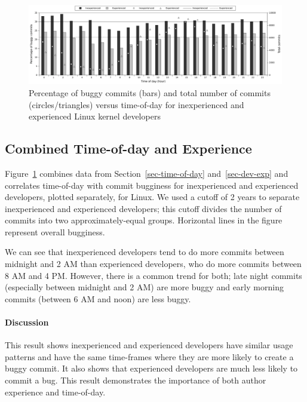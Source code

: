 \begin{figure}[tbh]
\includegraphics[width=\textwidth]{linux-bugginess-hour-experienced.pdf}
\caption{\label{fig-linux-bugginess-experienced}Percentage of buggy commits
  (bars) and total number of commits (circles/triangles) versus time-of-day for
  inexperienced and experienced Linux kernel developers}
\end{figure}

\subsection{Combined Time-of-day and Experience}
\label{sec:toddev-exp}

Figure~\ref{fig-linux-bugginess-experienced} combines data from
Section~\ref{sec-time-of-day} and~\ref{sec-dev-exp} and correlates time-of-day
with commit bugginess for inexperienced and experienced developers,
plotted separately, for Linux. We used
a cutoff of 2 years to separate inexperienced and experienced developers; 
this cutoff divides the number of commits into two approximately-equal groups. 
Horizontal lines in the figure represent overall
bugginess. 

We can see that inexperienced developers tend to do more commits between
midnight and 2 AM than experienced developers, who do more commits between 8 AM
and 4 PM. However, there is a common trend for both; late night commits
(especially between midnight and 2 AM) are more buggy and early morning commits
(between 6 AM and noon) are less buggy.

\paragraph{Discussion}

This result shows inexperienced and experienced developers have similar usage
patterns and have the same time-frames where they are more likely to create a
buggy commit. It also shows that experienced developers are much less likely to
commit a bug.  This result demonstrates the importance of both author experience
and time-of-day.

